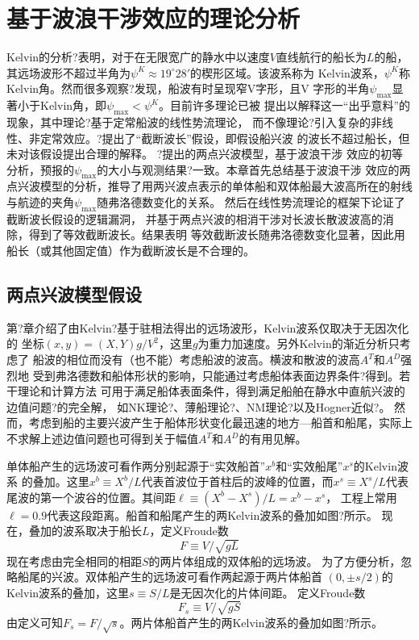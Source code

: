 \chapter{基于波浪干涉效应的理论分析}
\label{chap:analysis}
Kelvin的分析?表明，对于在无限宽广的静水中以速度$V$直线航行的船长为$L$的船，
其远场波形不超过半角为$\psi^K\approx19^\circ28'$的楔形区域。该波系称为
Kelvin波系，$\psi^K$称Kelvin角。然而很多观察?发现，船波有时呈现窄V字形，且V
字形的半角$\psi_\max$显著小于Kelvin角，即$\psi_{\max}<\psi^K$。目前许多理论已被
提出以解释这一``出乎意料''的现象，其中理论?基于定常船波的线性势流理论，
而不像理论?引入复杂的非线性、非定常效应。?提出了``截断波长''假设，即假设船兴波
的波长不超过船长，但未对该假设提出合理的解释。
?提出的两点兴波模型，基于波浪干涉
效应的初等分析，预报的$\psi_\max$的大小与观测结果?一致。本章首先总结基于波浪干涉
效应的两点兴波模型的分析，推导了用两兴波点表示的单体船和双体船最大波高所在的射线
与航迹的夹角$\psi_{\max}$随弗洛德数变化的关系。
然后在线性势流理论的框架下论证了截断波长假设的逻辑漏洞，
并基于两点兴波的相消干涉对长波长散波波高的消除，得到了等效截断波长。结果表明
等效截断波长随弗洛德数变化显著，因此用船长（或其他固定值）作为截断波长是不合理的。

\section{两点兴波模型假设}
\label{sec:2pwavmkr}

第?章介绍了由Kelvin?基于驻相法得出的远场波形，Kelvin波系仅取决于无因次化的
坐标$(x,y)=(X,Y)g/V^2$，这里$g$为重力加速度。另外Kelvin的渐近分析只考虑了
船波的相位而没有（也不能）考虑船波的波高。横波和散波的波高$A^T$和$A^D$强烈地
受到弗洛德数和船体形状的影响，只能通过考虑船体表面边界条件?得到。若干理论和计算方法
可用于满足船体表面条件，得到满足船舶在静水中直航兴波的边值问题?的完全解，
如NK理论?、薄船理论?、NM理论?以及Hogner近似?。
然而，考虑到船的主要兴波产生于船体形状变化最迅速的地方---船首和船尾，实际上
不求解上述边值问题也可得到关于幅值$A^T$和$A^D$的有用见解。

单体船产生的远场波可看作两分别起源于``实效船首''$x^b$和``实效船尾''$x^s$的Kelvin波系
的叠加。这里$x^b\equiv X^b/L$代表首波位于首柱后的波峰的位置，而$x^s\equiv X^s/L$代表
尾波的第一个波谷的位置。其间距$\ell\equiv (X^b-X^s)/L=x^b-x^s$，
工程上常用$\ell=0.9$代表这段距离。船首和船尾产生的两Kelvin波系的叠加如图?所示。
现在，叠加的波系取决于船长$L$，定义Froude数
\begin{equation}
  F\equiv V/\sqrt{gL}
  \label{eq:Fdef}
\end{equation}
现在考虑由完全相同的相距$S$的两片体组成的双体船的远场波。
为了方便分析，忽略船尾的兴波。双体船产生的远场波可看作两起源于两片体船首
$(0,\pm s/2)$的Kelvin波系的叠加，这里$s\equiv S/L$是无因次化的片体间距。
定义Froude数
\begin{equation}
  F_s\equiv V/\sqrt{gS}
  \label{eq:Fsdef}
\end{equation}
由定义可知$F_s=F/\sqrt{s}$。两片体船首产生的两Kelvin波系的叠加如图?所示。

